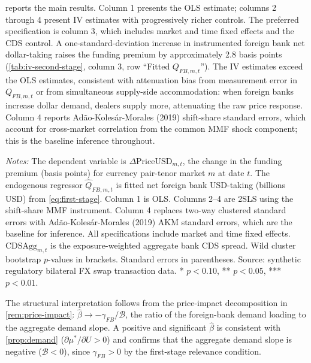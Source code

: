  reports the main results. Column 1 presents the
OLS estimate; columns 2 through 4 present IV estimates with progressively richer
controls. The preferred specification is column 3, which includes market and time
fixed effects and the CDS control. A one-standard-deviation increase in
instrumented foreign bank net dollar-taking raises the funding premium by
approximately 2.8 basis points (\cref{tab:iv-second-stage}, column 3, row ``Fitted
$Q_{FB,m,t}$''). The IV estimates exceed the OLS estimates, consistent with
attenuation bias from measurement error in $Q_{FB,m,t}$ or from simultaneous
supply-side accommodation: when foreign banks increase dollar demand, dealers
supply more, attenuating the raw price response. Column 4 reports Adão-Kolesár-Morales
(2019) shift-share standard errors, which account for cross-market correlation
from the common MMF shock component; this is the baseline inference throughout.

\begin{table}[htbp]
\centering
\begin{threeparttable}
\caption{Second Stage: Price Impact of Foreign Bank Dollar Demand}
\label{tab:iv-second-stage}

\begin{tablenotes}\small
\item \textit{Notes:} The dependent variable is $\Delta\text{PriceUSD}_{m,t}$,
the change in the funding premium (basis points) for currency pair-tenor market
$m$ at date $t$. The endogenous regressor $\hat{Q}_{FB,m,t}$ is fitted net
foreign bank USD-taking (billions USD) from \cref{eq:first-stage}. Column 1 is
OLS. Columns 2--4 are 2SLS using the shift-share MMF instrument. Column 4
replaces two-way clustered standard errors with Adão-Kolesár-Morales (2019) AKM
standard errors, which are the baseline for inference. All specifications include
market and time fixed effects. $\text{CDSAgg}_{m,t}$ is the exposure-weighted
aggregate bank CDS spread. Wild cluster bootstrap $p$-values in brackets.
Standard errors in parentheses. Source: synthetic regulatory bilateral FX swap
transaction data. * $p < 0.10$, ** $p < 0.05$, *** $p < 0.01$.
\end{tablenotes}
\end{threeparttable}
\end{table}

The structural interpretation follows from the price-impact decomposition in \cref{rem:price-impact}:
$\hat\beta \to -\gamma_{FB}/\mathcal{B}$, the ratio of the foreign-bank demand
loading to the aggregate demand slope. A positive and significant $\hat\beta$
is consistent with \cref{prop:demand} ($\partial\mu^*/\partial U > 0$) and confirms
that the aggregate demand slope is negative ($\mathcal{B} < 0$), since
$\gamma_{FB} > 0$ by the first-stage relevance condition.

